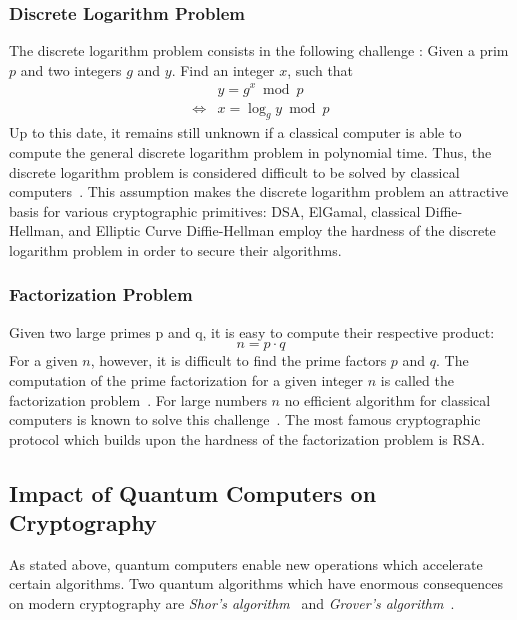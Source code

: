 \subsubsection{Discrete Logarithm Problem} \label{discrete_log_problem}
The discrete logarithm problem consists in the following challenge \parencite{beutelspacher2010diskrete}: Given a prim $p$ and two integers $g$ and $y$. Find an integer $x$, such that
\begin{equation*}
\begin{split}
&y = g^x \bmod p \\
\iff &x = \log_g y \bmod p
\end{split}
\end{equation*}
Up to this date, it remains still unknown if a classical computer is able to compute the general discrete logarithm problem in polynomial time. Thus, the discrete logarithm problem is considered difficult to be solved by classical computers~\parencite{beutelspacher2010diskrete}. This assumption makes the discrete logarithm problem an attractive basis for various cryptographic primitives: \gls{DSA}, ElGamal, classical Diffie-Hellman, and Elliptic Curve Diffie-Hellman employ the hardness of the discrete logarithm problem in order to secure their algorithms.

\subsubsection{Factorization Problem} \label{factorization_problem}

Given two large primes p and q, it is easy to compute their respective product:
\begin{equation*}
n = p \cdot q
\end{equation*}
For a given $n$, however, it is difficult to find the prime factors $p$ and $q$. The computation of the prime factorization for a given integer $n$ is called the factorization problem~\parencite{ITSicherheit}. For large numbers $n$ no efficient algorithm for classical computers is known to solve this challenge~\parencite{ITSicherheit}. The most famous cryptographic protocol which builds upon the hardness of the factorization problem is \gls{RSA}.

\subsection{Impact of Quantum Computers on Cryptography}

As stated above, quantum computers enable new operations which accelerate certain algorithms. Two quantum algorithms which have enormous consequences on modern cryptography are \textit{Shor's algorithm}~\parencite{shor1994algorithms} and \textit{Grover's algorithm}~\parencite{grover1996fast}.

